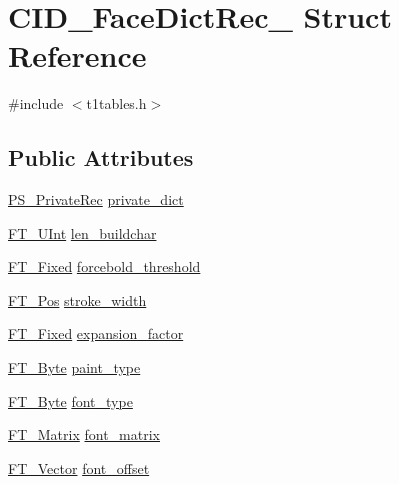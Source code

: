 \hypertarget{struct_c_i_d___face_dict_rec__}{\section{C\-I\-D\-\_\-\-Face\-Dict\-Rec\-\_\- Struct Reference}
\label{struct_c_i_d___face_dict_rec__}
}


{\ttfamily \#include $<$t1tables.\-h$>$}

\subsection*{Public Attributes}
\begin{DoxyCompactItemize}
\item 
\hyperlink{t1tables_8h_afe2ae1e8e05fe5f125ec128d7179a462}{P\-S\-\_\-\-Private\-Rec} \hyperlink{struct_c_i_d___face_dict_rec___a6ccc25ba0592648bbb7a4a163fc7fdb0}{private\-\_\-dict}
\item 
\hyperlink{fttypes_8h_abcb8db4dbf35d2b55a9e8c7b0926dc52}{F\-T\-\_\-\-U\-Int} \hyperlink{struct_c_i_d___face_dict_rec___aec468e2ef1159dd49d33ff3560e8d15b}{len\-\_\-buildchar}
\item 
\hyperlink{fttypes_8h_a5f5a679cc09f758efdd0d1c5feed3c3d}{F\-T\-\_\-\-Fixed} \hyperlink{struct_c_i_d___face_dict_rec___a4db0975dbd1211cb43f4dfc36061b3cb}{forcebold\-\_\-threshold}
\item 
\hyperlink{ftimage_8h_af5f230f4b253d4c7715fd2e595614c90}{F\-T\-\_\-\-Pos} \hyperlink{struct_c_i_d___face_dict_rec___a7da1ebfa4a184b696f789c27c07f23d1}{stroke\-\_\-width}
\item 
\hyperlink{fttypes_8h_a5f5a679cc09f758efdd0d1c5feed3c3d}{F\-T\-\_\-\-Fixed} \hyperlink{struct_c_i_d___face_dict_rec___ae601bb5bc25e9a5f3da8e7c12fef6c92}{expansion\-\_\-factor}
\item 
\hyperlink{fttypes_8h_a51f26183ca0c9f4af958939648caeccd}{F\-T\-\_\-\-Byte} \hyperlink{struct_c_i_d___face_dict_rec___a77e70cc8a5eba8e6a0f6a3a3e2e8d50c}{paint\-\_\-type}
\item 
\hyperlink{fttypes_8h_a51f26183ca0c9f4af958939648caeccd}{F\-T\-\_\-\-Byte} \hyperlink{struct_c_i_d___face_dict_rec___af26e3e5ca3d912c2512e85257b635837}{font\-\_\-type}
\item 
\hyperlink{fttypes_8h_afeacbc4365cf2ad77162b6292f3e3e23}{F\-T\-\_\-\-Matrix} \hyperlink{struct_c_i_d___face_dict_rec___aa418f6ce40b7574b6234e0ab48377e4b}{font\-\_\-matrix}
\item 
\hyperlink{ftimage_8h_ab158b5a7e422acb1968af95db786d018}{F\-T\-\_\-\-Vector} \hyperlink{struct_c_i_d___face_dict_rec___aa62daa8d45ed4a817f1207cbd452d61e}{font\-\_\-offset}

\end{DoxyCompactItemize}
